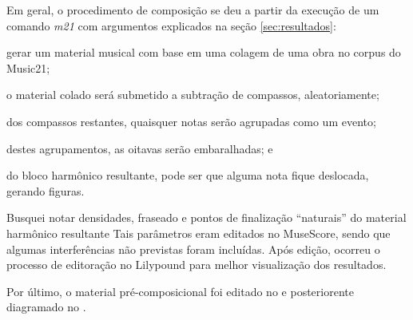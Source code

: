 Em geral, o procedimento de composição se deu a partir da execução de um comando \emph{m21} com argumentos explicados na seção \ref{sec:resultados}: \begin{inparaenum}
\item gerar um material musical com base em uma colagem de uma obra no corpus do Music21;
\item o material colado será submetido a subtração de compassos, aleatoriamente;
\item dos compassos restantes, quaisquer notas serão agrupadas como um evento;
\item destes agrupamentos, as oitavas serão embaralhadas; e
\item do bloco harmônico resultante, pode ser que alguma nota fique deslocada, gerando figuras.
\end{inparaenum}

Busquei notar densidades, fraseado e pontos de finalização ``naturais'' do material harmônico resultante Tais parâmetros eram editados no MuseScore, sendo que algumas interferências não previstas foram incluídas. Após edição, ocorreu o processo de editoração no Lilypound para melhor visualização dos resultados.

Por último, o material pré-composicional foi editado no \cite{musescore_2015} e posteriorente diagramado no \cite{lilypond_2015}.
